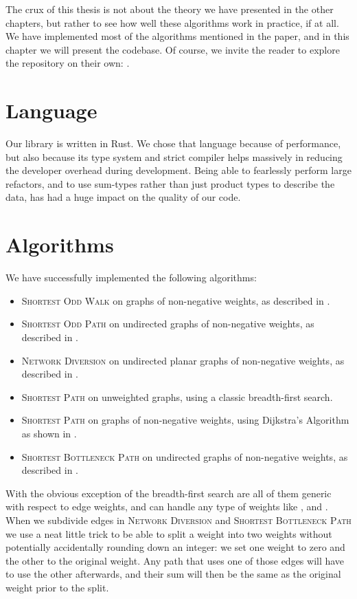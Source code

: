 The crux of this thesis is not about the theory we have presented in the other chapters, but rather to see how well these algorithms work in practice, if at all. We have implemented most of the algorithms mentioned in the paper, and in this chapter we will present the codebase. Of course, we invite the reader to explore the repository on their own: \cite{source:codebase}.

\section{Language}
Our library is written in Rust. We chose that language because of performance, but also because its type system and strict compiler helps massively in reducing the developer overhead during development. Being able to fearlessly perform large refactors, and to use sum-types rather than just product types to describe the data, has had a huge impact on the quality of our code. 

\section{Algorithms}
We have successfully implemented the following algorithms:

\begin{itemize}
    \item \textsc{Shortest Odd Walk} on graphs of non-negative weights, as described in .
    \item \textsc{Shortest Odd Path} on undirected graphs of non-negative weights, as described in .
    \item \textsc{Network Diversion} on undirected planar graphs of non-negative weights, as described in .
    \item \textsc{Shortest Path} on unweighted graphs, using a classic breadth-first search.
    \item \textsc{Shortest Path} on graphs of non-negative weights, using Dijkstra's Algorithm as shown in .
    \item \textsc{Shortest Bottleneck Path} on undirected graphs of non-negative weights, as described in .
\end{itemize}

With the obvious exception of the breadth-first search are all of them generic with respect to edge weights, and can handle any type of weights like ,  and . When we subdivide edges in \textsc{Network Diversion} and \textsc{Shortest Bottleneck Path} we use a neat little trick to be able to split a weight into two weights without potentially accidentally rounding down an integer: we set one weight to zero and the other to the original weight. Any path that uses one of those edges will have to use the other afterwards, and their sum will then be the same as the original weight prior to the split.

